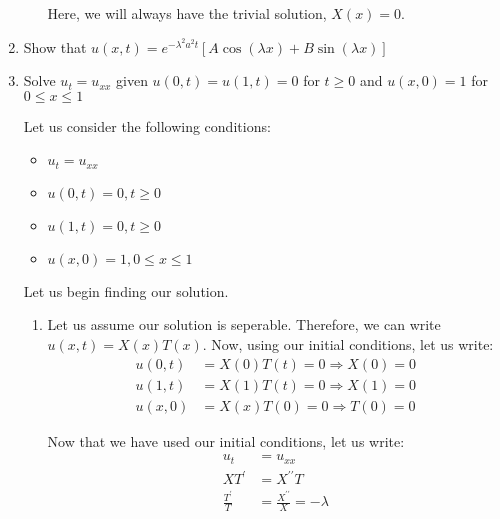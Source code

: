 \documentclass{article}
\begin{document}
\begin{enumerate}
\begin{enumerate}
  Here, we will always have the trivial solution, $X(x) = 0$.

\end{enumerate}
%
%
\newpage
%
%
  \item Show that $u(x, t) = e^{-\lambda^2 a^2 t}\left[ A \cos(\lambda x) + B \sin(\lambda x) \right]$
%



%
%
\newpage
%
%
  \item Solve $u_t = u_{xx}$ given $u(0, t) = u(1, t) = 0$ for $t \geq 0$ and $u(x, 0) = 1$ for $0 \leq x \leq 1$
%
%

Let us consider the following conditions:
%
\begin{itemize}
  \item $u_t = u_{xx}$
  \item $u(0, t) = 0, t \geq 0$
  \item $u(1, t) = 0, t \geq 0$
  \item $u(x, 0) = 1, 0 \leq x \leq 1$
\end{itemize}

Let us begin finding our solution.
\begin{enumerate}
  \item Let us assume our solution is seperable. Therefore, we can write $u(x, t) = X(x)T(x)$. Now, using our initial conditions, let us write:
  \begin{align}
    u(0, t) & = X(0)T(t) = 0 \Rightarrow X(0) = 0\\
    u(1, t) & = X(1)T(t) = 0 \Rightarrow X(1) = 0\\
    u(x, 0) & = X(x)T(0) = 0 \Rightarrow T(0) = 0
  \end{align}

  Now that we have used our initial conditions, let us write:
  \begin{align}
    u_t & = u_{xx}\\
    XT^\prime & = X^{\prime\prime}T\\
    \frac{T^\prime}{T} & = \frac{X^{\prime\prime}}{X} = -\lambda
  \end{align}


\end{enumerate}
\end{enumerate}
\end{document}
